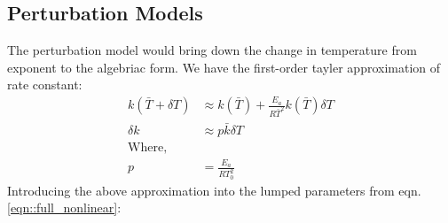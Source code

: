\subsection{Perturbation Models}
The perturbation model would bring down the change in
temperature from exponent to the algebriac form. We have the first-order tayler
approximation of rate constant:
\begin{align*}
    k(\bar T + \delta T) &\approx k(\bar T) + \frac{E_a}{R\bar T^2} k(\bar T) \delta T\\
    \delta k &\approx p \bar k \delta T\\
    \text{Where,} \quad &\\
    p &= \frac{E_a}{RT_0^2}
\end{align*}
Introducing the above approximation into the lumped parameters from eqn.\ref{eqn::full_nonlinear}:
